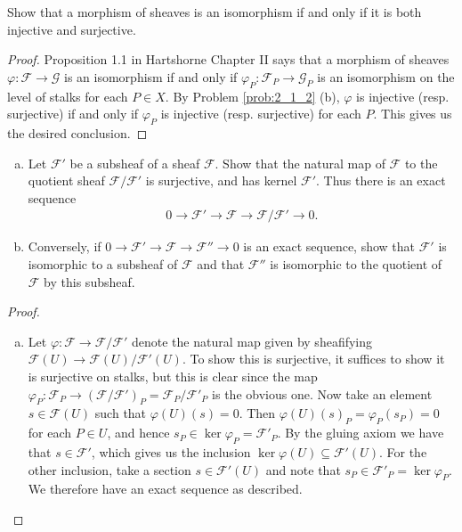 \begin{problemset}
\item Show that a morphism of sheaves is an isomorphism if and only if it is both injective and surjective.
	\begin{proof}
		Proposition 1.1 in Hartshorne Chapter II says that a morphism of sheaves $\varphi:\mathcal F\to \mathcal G$ is an isomorphism if and only if $\varphi_P:\mathcal F_P\to \mathcal G_P$ is an isomorphism on the level of stalks for each $P\in X$. By Problem \ref{prob:2_1_2} (b), $\varphi$ is injective (resp. surjective) if and only if $\varphi_P$ is injective (resp. surjective) for each $P$. This gives us the desired conclusion.
	\end{proof}
\item
	\begin{enumerate}[(a)]
		\item Let $\mathcal F'$ be a subsheaf of a sheaf $\mathcal F$. Show that the natural map of $\mathcal F$ to the quotient sheaf $\mathcal F/\mathcal F'$ is surjective, and has kernel $\mathcal F'$. Thus there is an exact sequence
			\begin{align*}
				0 \to \mathcal F' \to \mathcal F\to \mathcal F/\mathcal F' \to 0.
			\end{align*}
		\item Conversely, if $0\to \mathcal F'\to \mathcal F\to \mathcal F''\to 0$ is an exact sequence, show that $\mathcal F'$ is isomorphic to a subsheaf of $\mathcal F$ and that $\mathcal F''$ is isomorphic to the quotient of $\mathcal F$ by this subsheaf.
	\end{enumerate}
	\begin{proof}$ $
		\begin{enumerate}[(a)]
			\item Let $\varphi:\mathcal F\to \mathcal F/\mathcal F'$ denote the natural map given by sheafifying $\mathcal F(U)\to \mathcal F(U)/\mathcal F'(U)$. To show this is surjective, it suffices to show it is surjective on stalks, but this is clear since the map $\varphi_P:\mathcal F_P \to (\mathcal F/\mathcal F')_P = \mathcal F_P/\mathcal F'_P$ is the obvious one. Now take an element $s\in \mathcal F(U)$ such that $\varphi(U)(s) = 0$. Then $\varphi(U)(s)_P = \varphi_P(s_P) = 0$ for each $P\in U$, and hence $s_P \in \ker \varphi_P = \mathcal F'_P$. By the gluing axiom we have that $s\in \mathcal F'$, which gives us the inclusion $\ker\varphi(U)\subseteq \mathcal F'(U)$. For the other inclusion, take a section $s\in \mathcal F'(U)$ and note that $s_P \in \mathcal F'_P = \ker\varphi_P$. We therefore have an exact sequence as described.


\end{enumerate}
\end{proof}
\end{problemset}
